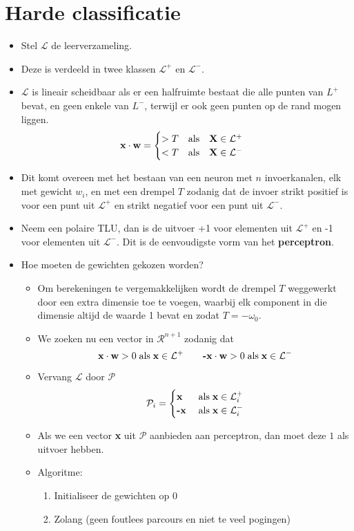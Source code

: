 \section{Harde classificatie}
\begin{itemize}
    \item Stel $\mathcal{L}$ de leerverzameling.
    \item Deze is verdeeld in twee klassen $\mathcal{L}^+$ en $\mathcal{L}^-$.
    \item $\mathcal{L}$ is lineair scheidbaar als er een halfruimte bestaat die alle punten van $L^+$ bevat, en geen enkele van $L^-$, terwijl er ook geen punten op de rand mogen liggen. 
    $$\textbf{x} \cdot \textbf{w} = \begin{cases}
        > T \quad \hbox{als} \quad \textbf{X} \in \mathcal{L}^+ \\
        < T \quad \hbox{als} \quad \textbf{X} \in \mathcal{L}^-
    \end{cases}$$
    \item Dit komt overeen met het bestaan van een neuron met $n$ invoerkanalen, elk met gewicht $w_i$, en met een drempel $T$ zodanig dat de invoer strikt positief is voor een punt uit $\mathcal{L}^+$ en strikt negatief voor een punt uit $\mathcal{L}^-$.
    \item Neem een polaire TLU, dan is de uitvoer +1 voor elementen uit $\mathcal{L}^+$ en -1 voor elementen uit $\mathcal{L}^-$. Dit is de eenvoudigste vorm van het \textbf{perceptron}.
    \item Hoe moeten de gewichten gekozen worden?
    \begin{itemize}
        \item Om berekeningen te vergemakkelijken wordt de drempel $T$ weggewerkt door een extra dimensie toe te voegen, waarbij elk component in die dimensie altijd de waarde 1 bevat en zodat $T = -\omega_0$.
        \item We zoeken nu een vector in $\mathcal{R}^{n + 1}$ zodanig dat
        $$\textbf{x} \cdot \textbf{w} > 0 \; \hbox{als}\;\textbf{x} \in \mathcal{L}^+ \qquad \textbf{-x} \cdot \textbf{w} > 0 \; \hbox{als}\;\textbf{x} \in \mathcal{L}^-$$
        \item Vervang $\mathcal{L}$ door $\mathcal{P}$
        $$\mathcal{P}_i = \begin{cases}
            \textbf{x} \; & \hbox{als}  \;\textbf{x} \in \mathcal{L}_i^+ \\
            \textbf{-x} \; & \hbox{als}  \;\textbf{x} \in \mathcal{L}_i^-
        \end{cases}$$
        \item Als we een vector \textbf{x} uit $\mathcal{P}$ aanbieden aan perceptron, dan moet deze $1$ als uitvoer hebben. 
        \item Algoritme:
        \begin{enumerate}
            \item Initialiseer de gewichten op 0
            \item Zolang (geen foutlees parcours en niet te veel pogingen)
   

\end{enumerate}
\end{itemize}
\end{itemize}
